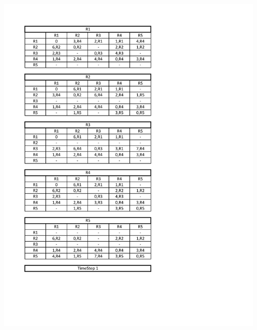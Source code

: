 \documentclass[12pt]{article}
\begin{document}
 \begin{center}
	\includegraphics[width = 1.0 \textwidth]{images/2.pdf}
\end{center}
\end{document}
